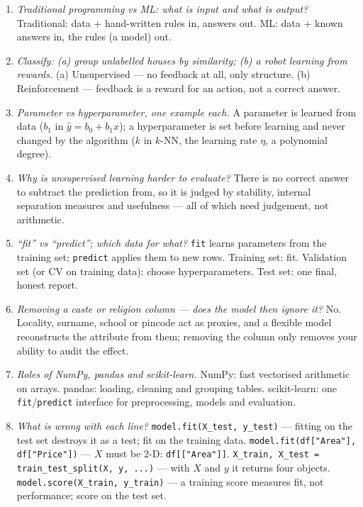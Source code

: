 \documentclass[11pt]{article}
\begin{document}
\begin{concept}
\begin{enumerate}[label=\textbf{C1.\arabic*}]
  \item \emph{Traditional programming vs ML: what is input and what is
    output?} Traditional: data + hand-written rules in, answers out. ML: data
    + known answers in, the rules (a model) out.
  \item \emph{Classify: (a) group unlabelled houses by similarity; (b) a
    robot learning from rewards.} (a) Unsupervised --- no feedback at all,
    only structure. (b) Reinforcement --- feedback is a reward for an action,
    not a correct answer.
  \item \emph{Parameter vs hyperparameter, one example each.} A parameter is
    learned from data ($b_1$ in $\hat y = b_0 + b_1x$); a hyperparameter is set
    before learning and never changed by the algorithm ($k$ in $k$-NN, the
    learning rate $\eta$, a polynomial degree).
  \item \emph{Why is unsupervised learning harder to evaluate?} There is no
    correct answer to subtract the prediction from, so it is judged by
    stability, internal separation measures and usefulness --- all of which
    need judgement, not arithmetic.
  \item \emph{``fit'' vs ``predict''; which data for what?} \texttt{fit}
    learns parameters from the training set; \texttt{predict} applies them to
    new rows. Training set: fit. Validation set (or CV on training data):
    choose hyperparameters. Test set: one final, honest report.
  \item \emph{Removing a caste or religion column --- does the model then
    ignore it?} No. Locality, surname, school or pincode act as proxies, and a
    flexible model reconstructs the attribute from them; removing the column
    only removes your ability to audit the effect.
  \item \emph{Roles of NumPy, pandas and scikit-learn.} NumPy: fast
    vectorised arithmetic on arrays. pandas: loading, cleaning and grouping
    tables. scikit-learn: one \texttt{fit}/\texttt{predict} interface for
    preprocessing, models and evaluation.
  \item \emph{What is wrong with each line?}
    \texttt{model.fit(X\_test, y\_test)} --- fitting on the test set destroys
    it as a test; fit on the training data.
    \texttt{model.fit(df["Area"], df["Price"])} --- $X$ must be 2-D:
    \texttt{df[["Area"]]}.
    \texttt{X\_train, X\_test = train\_test\_split(X, y, ...)} --- with $X$
    and $y$ it returns four objects.
    \texttt{model.score(X\_train, y\_train)} --- a training score measures
    fit, not performance; score on the test set.
\end{enumerate}
\end{concept}
\end{document}
